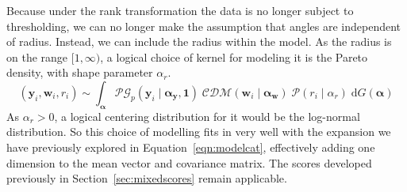 Because under the rank transformation the data is no longer subject to thresholding, 
    we can no longer make the assumption that angles are independent of radius.  Instead,
    we can include the radius within the model.  As the radius is on the range $[1,\infty)$, 
    a logical choice of kernel for modeling it is the Pareto density, with shape parameter 
    $\alpha_r$.  
    \begin{equation}
        \label{model:rank}
        (\bm{y}_i,\bm{w}_i,r_i) \sim \int_{\bm{\alpha}}
            \mathcal{PG}_p(\bm{y}_i\mid\bm{\alpha}_{\bm{y}}, \bm{1})\;
            \mathcal{CDM}(\bm{w}_i\mid\bm{\alpha}_{\bm{w}})\;
            \mathcal{P}(r_i\mid\alpha_r)\;
            \text{d}G(\bm{\alpha})
    \end{equation}
    As $\alpha_r > 0$, a logical centering distribution for it would be the log-normal distribution.
    So this choice of modelling fits in very well with the expansion we have previously explored
    in Equation~\ref{eqn:modelcat}, effectively adding one dimension to the mean vector and
    covariance matrix.  The scores developed previously in Section~\ref{sec:mixedscores} 
    remain applicable.

